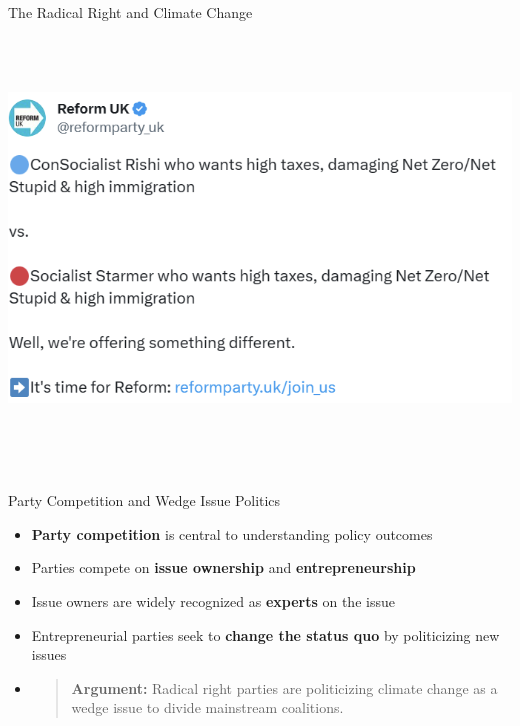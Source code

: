\documentclass[
  ignorenonframetext,
]{beamer}
\begin{document}
\begin{frame}
\begin{block}{The Radical Right and Climate Change}
\includegraphics[width=6.77083in,height=4.6875in]{images/reform_uk.png}
\end{block}
\end{frame}

\begin{frame}{Party Competition and Wedge Issue Politics}
\label{party-competition-and-wedge-issue-politics}
\begin{itemize}[<+->]
\item
  \textbf{Party competition} is central to understanding policy outcomes
\item
  Parties compete on \textbf{issue ownership} and
  \textbf{entrepreneurship}
\item
  Issue owners are widely recognized as \textbf{experts} on the issue
\item
  Entrepreneurial parties seek to \textbf{change the status quo} by
  politicizing new issues
\item
  \begin{quote}
  \textbf{Argument:} Radical right parties are politicizing climate
  change as a wedge issue to divide mainstream coalitions.
  \end{quote}
\end{itemize}
\end{frame}
\end{document}
